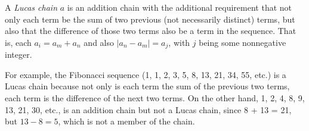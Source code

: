 \documentclass[12pt]{article}
\begin{document}
A {\em Lucas chain} $a$ is an addition chain with the additional requirement that not only each term be the sum of two previous (not necessarily distinct) terms, but also that the difference of those two terms also be a term in the sequence. That is, each $a_i = a_m + a_n$ and also $|a_n - a_m| = a_j$, with $j$ being some nonnegative integer.

For example, the Fibonacci sequence (1, 1, 2, 3, 5, 8, 13, 21, 34, 55, etc.) is a Lucas chain because not only is each term the sum of the previous two terms, each term is the difference of the next two terms. On the other hand, 1, 2, 4, 8, 9, 13, 21, 30, etc., is an addition chain but not a Lucas chain, since 8 + 13 = 21, but $13 - 8 = 5$, which is not a member of the chain.
\end{document}
